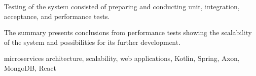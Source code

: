 \documentclass[
    bindingoffset=5mm,  %
    footnoteindent=3mm, %
    hyphenation=true    %
]{src/wut-thesis}
\begin{document}
Testing of the system consisted of preparing and conducting unit, integration, acceptance, and performance tests.

The summary presents conclusions from performance tests showing the scalability of the system and possibilities for its further development.

\secondkeywords microservices architecture, scalability, web applications, Kotlin, Spring, Axon, MongoDB, React

\pagestyle{plain}

\cleardoublepage %
\tableofcontents

\cleardoublepage %
\pagestyle{headings}








\cleardoublepage %
\printbibliography
\clearpage


\pagestyle{plain}

\listoffigurestoc    %
\vspace{1cm}         %
\listoftablestoc     %
\vspace{1cm}         %
\listofappendicestoc %
\vspace{1cm}
\listoflistingstoc   %

\end{document}
